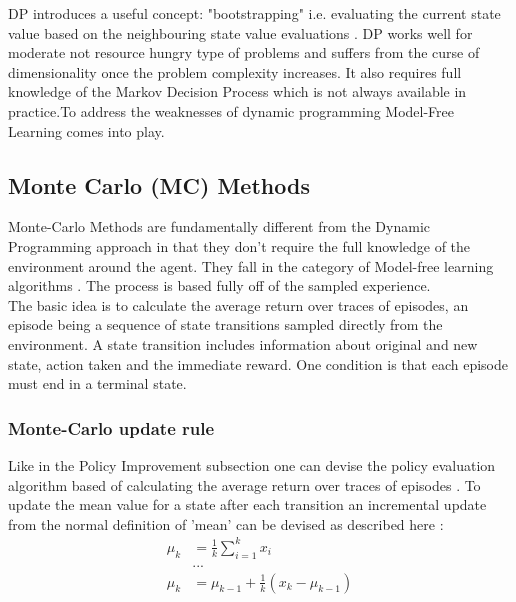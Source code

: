 DP introduces a useful concept: "bootstrapping" i.e. evaluating the current state value based on the neighbouring state value evaluations \cite{lecture_dp}. DP works well for moderate not resource hungry type of problems and suffers from the curse of dimensionality once the problem complexity increases. It also requires full knowledge of the Markov Decision Process which is not always available in practice.To address the weaknesses of dynamic programming Model-Free Learning comes into play.

\subsection{Monte Carlo (MC) Methods}

Monte-Carlo Methods are fundamentally different from the 
Dynamic Programming approach in that they don't require the 
full knowledge of the environment around the agent. They fall
in the category of Model-free learning algorithms \cite{lecture_mfl}. The process is based fully off of the sampled experience.  \\

The basic idea is to calculate the average return over traces of episodes, an episode being a sequence of state transitions sampled directly from the environment. A state transition includes information about original and new state, action taken and the immediate reward. One condition is that each episode must end in a terminal state. 

\subsubsection{Monte-Carlo update rule}

Like in the Policy Improvement subsection one can devise the policy evaluation algorithm based of calculating the average return over traces of episodes \cite{lecture_mfl}. 
To update the mean value for a state after each transition an incremental update from the normal definition of 'mean' can be devised as described here \cite{lecture_mfl} :
\begin{align}
    \mu_k &= \frac{1}{k}\sum^{k}_{i = 1} x_i \nonumber \\
    &... \nonumber \\
    \mu_k &= \mu_{k - 1} + \frac{1}{k} (x_k - \mu_{k - 1})
\end{align}

